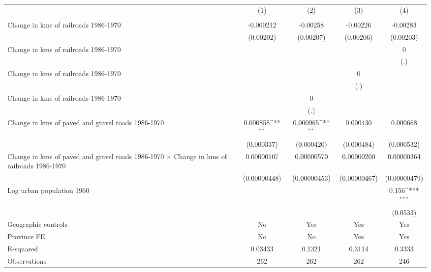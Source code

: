 {
\def\sym#1{\ifmmode^{#1}\else\(^{#1}\)\fi}
\begin{tabular}{l*{4}{c}}
\hline\hline
                &\multicolumn{1}{c}{(1)}&\multicolumn{1}{c}{(2)}&\multicolumn{1}{c}{(3)}&\multicolumn{1}{c}{(4)}\\
                &\multicolumn{1}{c}{}&\multicolumn{1}{c}{}&\multicolumn{1}{c}{}&\multicolumn{1}{c}{}\\
\hline
Change in kms of railroads 1986-1970&-0.000212         & -0.00258         & -0.00226         & -0.00283         \\
                &(0.00202)         &(0.00207)         &(0.00206)         &(0.00203)         \\
[1em]
Change in kms of railroads 1986-1970&                  &                  &                  &        0         \\
                &                  &                  &                  &      (.)         \\
[1em]
Change in kms of railroads 1986-1970&                  &                  &        0         &                  \\
                &                  &                  &      (.)         &                  \\
[1em]
Change in kms of railroads 1986-1970&                  &        0         &                  &                  \\
                &                  &      (.)         &                  &                  \\
[1em]
Change in kms of paved and gravel roads 1986-1970& 0.000858\sym{**} & 0.000965\sym{**} & 0.000430         & 0.000668         \\
                &(0.000337)         &(0.000420)         &(0.000484)         &(0.000532)         \\
[1em]
Change in kms of paved and gravel roads 1986-1970 $\times$ Change in kms of railroads 1986-1970&0.00000107         &0.00000570         &0.00000200         &0.00000364         \\
                &(0.00000448)         &(0.00000453)         &(0.00000467)         &(0.00000479)         \\
[1em]
Log urban population 1960&                  &                  &                  &    0.156\sym{***}\\
                &                  &                  &                  & (0.0533)         \\
\hline
Geographic controls&       No         &      Yes         &      Yes         &      Yes         \\
Province FE     &       No         &       No         &      Yes         &      Yes         \\
R-squared       &  0.03433         &   0.1321         &   0.3114         &   0.3333         \\
Observations    &      262         &      262         &      262         &      246         \\
\hline\hline
\end{tabular}
}
